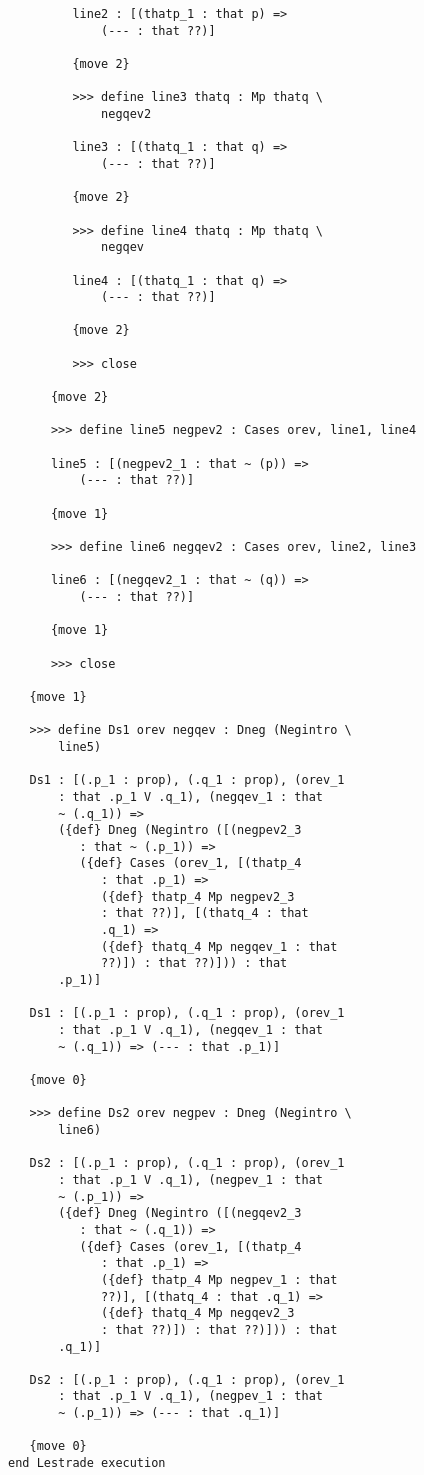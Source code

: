 \documentclass[12pt]{article}
\begin{document}
\begin{verbatim}
         line2 : [(thatp_1 : that p) => 
             (--- : that ??)]

         {move 2}

         >>> define line3 thatq : Mp thatq \
             negqev2

         line3 : [(thatq_1 : that q) => 
             (--- : that ??)]

         {move 2}

         >>> define line4 thatq : Mp thatq \
             negqev

         line4 : [(thatq_1 : that q) => 
             (--- : that ??)]

         {move 2}

         >>> close

      {move 2}

      >>> define line5 negpev2 : Cases orev, line1, line4

      line5 : [(negpev2_1 : that ~ (p)) => 
          (--- : that ??)]

      {move 1}

      >>> define line6 negqev2 : Cases orev, line2, line3

      line6 : [(negqev2_1 : that ~ (q)) => 
          (--- : that ??)]

      {move 1}

      >>> close

   {move 1}

   >>> define Ds1 orev negqev : Dneg (Negintro \
       line5)

   Ds1 : [(.p_1 : prop), (.q_1 : prop), (orev_1 
       : that .p_1 V .q_1), (negqev_1 : that 
       ~ (.q_1)) => 
       ({def} Dneg (Negintro ([(negpev2_3 
          : that ~ (.p_1)) => 
          ({def} Cases (orev_1, [(thatp_4 
             : that .p_1) => 
             ({def} thatp_4 Mp negpev2_3 
             : that ??)], [(thatq_4 : that 
             .q_1) => 
             ({def} thatq_4 Mp negqev_1 : that 
             ??)]) : that ??)])) : that 
       .p_1)]

   Ds1 : [(.p_1 : prop), (.q_1 : prop), (orev_1 
       : that .p_1 V .q_1), (negqev_1 : that 
       ~ (.q_1)) => (--- : that .p_1)]

   {move 0}

   >>> define Ds2 orev negpev : Dneg (Negintro \
       line6)

   Ds2 : [(.p_1 : prop), (.q_1 : prop), (orev_1 
       : that .p_1 V .q_1), (negpev_1 : that 
       ~ (.p_1)) => 
       ({def} Dneg (Negintro ([(negqev2_3 
          : that ~ (.q_1)) => 
          ({def} Cases (orev_1, [(thatp_4 
             : that .p_1) => 
             ({def} thatp_4 Mp negpev_1 : that 
             ??)], [(thatq_4 : that .q_1) => 
             ({def} thatq_4 Mp negqev2_3 
             : that ??)]) : that ??)])) : that 
       .q_1)]

   Ds2 : [(.p_1 : prop), (.q_1 : prop), (orev_1 
       : that .p_1 V .q_1), (negpev_1 : that 
       ~ (.p_1)) => (--- : that .q_1)]

   {move 0}
end Lestrade execution
\end{verbatim}
\end{document}
